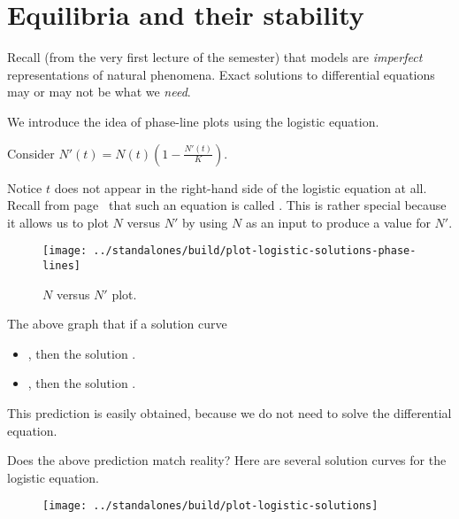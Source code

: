 \documentclass[../main.tex]{subfiles}
\begin{document}
 \section{Equilibria and their stability}

Recall (from the very first lecture of the semester) that models are \emph{imperfect} representations of natural phenomena. Exact solutions to differential equations may or may not be what we \emph{need}.  

We introduce the idea of phase-line plots using the logistic equation. 

\begin{example}
  Consider \(N'(t) = N(t) \left( 1 - \frac{N'(t)}{K} \right)\).

  Notice \(t\) does not appear in the right-hand side of the logistic equation at all. Recall from page~\pageref{def:autonomous} that such an equation is called . This is rather special because it allows us to plot \(N\) versus \(N'\) by using \(N\) as an input to produce a value for \(N'\).

  \begin{figure}[H] %
    \centering
    \texttt{[image: ../standalones/build/plot-logistic-solutions-phase-lines]}
    \caption{\(N\) versus \(N'\) plot.}
    \label{fig:logistic-solutions-phase-lines}
  \end{figure}

  \faStar{} The above graph  that if a solution curve 
  \begin{itemize}
    \item \underline{\hspace{2in}}, then the solution \underline{\hspace{3in}}.
    \item \underline{\hspace{2in}}, then the solution \underline{\hspace{3in}}.
  \end{itemize}

  This prediction is easily obtained, because we do not need to solve the differential equation.

  Does the above prediction match reality? Here are several solution curves for the logistic equation.
  \begin{figure}[H] %
    \centering
    \texttt{[image: ../standalones/build/plot-logistic-solutions]}
    \label{fig:logistic-solutions}
  \end{figure}

\end{example}
\end{document}
